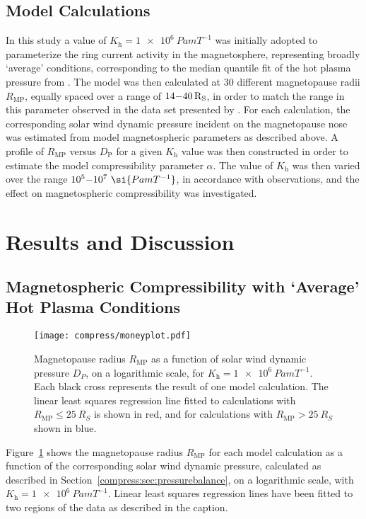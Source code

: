 \subsection{Model Calculations}
In this study a value of $K_\mathrm{h}=\SI{1e6}{Pa m T^{-1}}$ was initially adopted to parameterize the ring current activity in the magnetosphere, representing broadly `average' conditions, corresponding to the median quantile fit of the hot plasma pressure from \citet{sergis2007} \cite[see][Figure 6b]{achilleos2010a}. The model was then calculated at 30 different magnetopause radii $R_\mathrm{MP}$, equally spaced over a range of $14{\--}\SI{40}{R_S}$, in order to match the range in this parameter observed in the data set presented by \citet{pilkington2015}. For each calculation, the corresponding solar wind dynamic pressure incident on the magnetopause nose was estimated from model magnetospheric parameters as described above. A profile of $R_\mathrm{MP}$ versus $D_\mathrm{P}$ for a given $K_\mathrm{h}$ value was then constructed in order to estimate the model compressibility parameter $\alpha$. The value of $K_\mathrm{h}$ was then varied over the range $10^5{\--}10^7~\si{Pa m T^{-1}}$, in accordance with observations, and the effect on magnetospheric compressibility was investigated. 

\section{Results and Discussion}\label{compress:sec:results}
\subsection{Magnetospheric Compressibility with `Average' Hot Plasma Conditions}
\begin{figure}
\centering
\noindent\texttt{[image: compress/moneyplot.pdf]}
\caption[Magnetopause radius versus solar wind dynamic pressure compressibility profile for `typical' hot plasma content $K_\mathrm{H}$.]{Magnetopause radius $R_\mathrm{MP}$ as a function of solar wind dynamic pressure $D_{P}$, on a logarithmic scale, for $K_\mathrm{h}=\SI{1e6}{Pa m T^{-1}}$. Each black cross represents the result of one model calculation. The linear least squares regression line fitted to calculations with $R_\mathrm{MP} \leq \SI{25}{R_S}$ is shown in red, and for calculations with $R_\mathrm{MP} > \SI{25}{R_S}$ shown in blue.}
\label{compress:fig:money1}
\end{figure}
Figure~\ref{compress:fig:money1} shows the magnetopause radius $R_\mathrm{MP}$ for each model calculation as a function of the corresponding solar wind dynamic pressure, calculated as described in Section~\ref{compress:sec:pressurebalance}, on a logarithmic scale, with $K_\mathrm{h}=\SI{1e6}{Pa m T^{-1}}$. Linear least squares regression lines have been fitted to two regions of the data as described in the caption.

